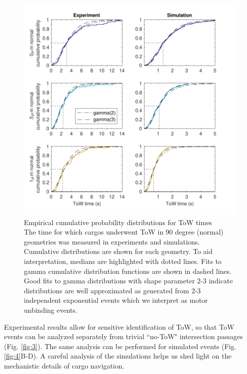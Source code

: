 \begin{figure}
\centering
\includegraphics[width=6in]{appendix2/ToWtime_fits.pdf}
\caption[Empirical cumulative probability distributions for ToW times]{Empirical cumulative probability distributions for ToW times \\
The time for which cargos underwent ToW in 90 degree (normal) geometries was measured in experiments and simulations. Cumulative distributions are shown for each geometry. To aid interpretation, medians are highlighted with dotted lines. Fits to gamma cumulative distribution functions are shown in dashed lines. Good fits to gamma distributions with shape parameter 2-3 indicate distributions are well approximated as generated from 2-3 independent exponential events which we interpret as motor unbinding events.
} \label{fig:ToWtimes}
\end{figure}

Experimental results allow for sensitive identification of ToW, so that ToW events can be analyzed separately from trivial ``no-ToW" intersection passages (Fig. \ref{fig:3}). The same analysis can be performed for simulated events (Fig. \ref{fig:4}B-D). A careful analysis of the simulations helps us shed light on the mechanistic details of cargo navigation.

